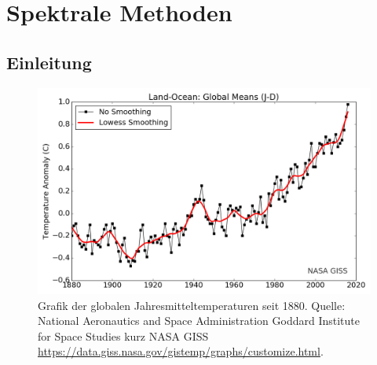 \chapter{Spektrale Methoden\label{chapter:klima}}
\begin{refsection}



\section{Einleitung
\label{klima:einleitung}}

\begin{figure}
\centering
\includegraphics[width=\hsize]{klima/nasa_giss.png}
\caption{Grafik der globalen Jahresmitteltemperaturen seit 1880. Quelle: National Aeronautics and Space Administration Goddard Institute for Space Studies kurz NASA GISS \url{https://data.giss.nasa.gov/gistemp/graphs/customize.html}.
\label{klima:einleitung:nasa}}
\end{figure}


\end{refsection}
